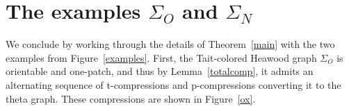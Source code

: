 \documentclass[11pt, oneside]{amsart}
\theoremstyle{theorem}
\newtheorem{question}[theorem]{Question}
\theoremstyle{definition}
\theoremstyle{theorem}
\begin{document}

\section{The examples $\Sigma_O$ and $\Sigma_N$}\label{examp}

We conclude by working through the details of Theorem~\ref{main} with the two examples from Figure~\ref{examples}.  First, the Tait-colored Heawood graph $\Sigma_O$ is orientable and one-patch, and thus by Lemma~\ref{totalcomp}, it admits an alternating sequence of t-compressions and p-compressions converting it to the theta graph.  These compressions are shown in Figure~\ref{ox}.
\end{document}
